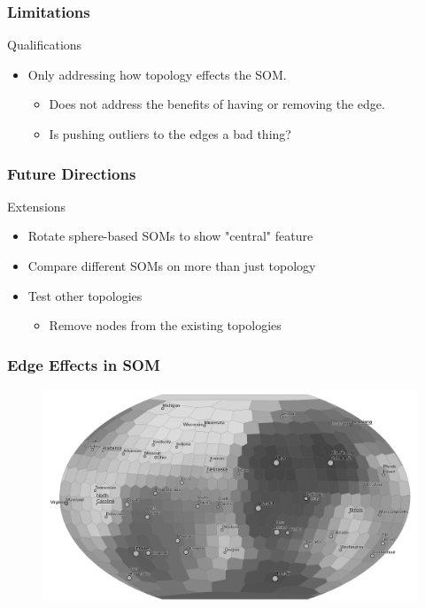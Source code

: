 \documentclass[nototal,handout]{beamer}
\begin{document}
\begin{frame}
	\frametitle{Limitations}
 
\begin{block}{Qualifications}
 \begin{itemize}
 \item  Only addressing how topology effects the SOM.
 \begin{itemize}
 \item  Does not address the benefits of having or removing the edge.
 \item  Is pushing outliers to the edges a bad thing?
 \end{itemize}
 \end{itemize}
 \end{block} \end{frame} 

\begin{frame}
	\frametitle{Future Directions}
 
\begin{block}{Extensions}
 \begin{itemize}
 \item  Rotate sphere-based SOMs to show "central" feature
 \item  Compare different SOMs on more than just topology
 \item  Test other topologies
 \begin{itemize}
 \item  Remove nodes from the existing topologies
 \end{itemize}
 \end{itemize}
 \end{block} \end{frame} 

\begin{frame}
	\frametitle{Edge Effects in SOM}
  \begin{center}
  \begin{figure}
  \includegraphics[width=\linewidth]{statesSphere.png}
  \end{figure}
  \end{center}
 \end{frame}
\end{document}
